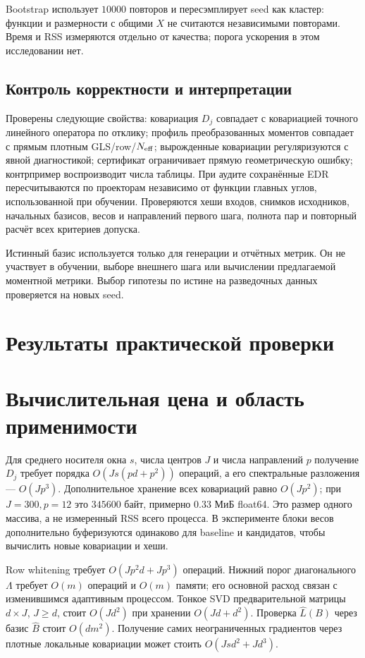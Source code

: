 \documentclass[11pt,a4paper]{article}
\begin{document}
Bootstrap использует $10000$ повторов и пересэмплирует seed как
кластер: функции и размерности с общими $X$ не считаются независимыми
повторами. Время и RSS измеряются отдельно от качества; порога
ускорения в этом исследовании нет.

\subsection{Контроль корректности и интерпретации}
Проверены следующие свойства: ковариация $D_j$ совпадает с ковариацией
точного линейного оператора по отклику; профиль преобразованных моментов
совпадает с прямым плотным GLS/row/$N_{\rm eff}$; вырожденные ковариации
регуляризуются с явной диагностикой; сертификат ограничивает прямую
геометрическую ошибку; контрпример воспроизводит числа таблицы.
При аудите сохранённые EDR пересчитываются по проекторам независимо
от функции главных углов, использованной при обучении. Проверяются
хеши входов, снимков исходников, начальных базисов, весов и направлений
первого шага, полнота пар и повторный расчёт всех критериев допуска.

Истинный базис используется только для генерации и отчётных метрик.
Он не участвует в обучении, выборе внешнего шага или вычислении
предлагаемой моментной метрики. Выбор гипотезы по истине на
разведочных данных проверяется на новых seed.

\section{Результаты практической проверки}\label{sec:results}


\section{Вычислительная цена и область применимости}
Для среднего носителя окна $s$, числа центров $J$ и числа направлений $p$
получение $D_j$ требует порядка $O(Js(pd+p^2))$ операций,
а его спектральные разложения --- $O(Jp^3)$.
Дополнительное хранение всех ковариаций равно $O(Jp^2)$;
при $J=300,p=12$ это $345600$ байт, примерно $0.33$ МиБ float64.
Это размер одного массива, а не измеренный RSS всего процесса.
В эксперименте блоки весов дополнительно буферизуются одинаково
для baseline и кандидатов, чтобы вычислить новые ковариации и хеши.

Row whitening требует $O(Jp^2d+Jp^3)$ операций. Нижний порог
диагонального $\Lambda$ требует $O(m)$ операций и $O(m)$ памяти;
его основной расход связан с изменившимся адаптивным процессом.
Тонкое SVD предварительной матрицы $d\times J$, $J\ge d$,
стоит $O(Jd^2)$ при хранении $O(Jd+d^2)$. Проверка $\widehat L(B)$
через базис $\widehat B$ стоит $O(dm^2)$.
Получение самих неограниченных градиентов через плотные локальные
ковариации может стоить $O(Jsd^2+Jd^3)$.
\end{document}
